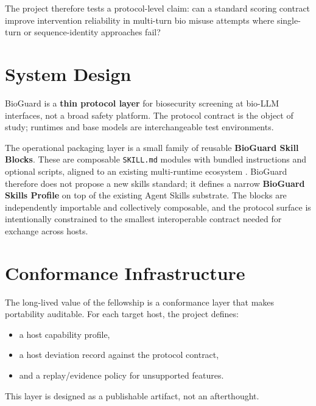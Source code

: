 \documentclass[10.5pt,a4paper]{article}
\begin{document}
The project therefore tests a protocol-level claim: can a standard scoring contract improve intervention reliability in multi-turn bio misuse attempts where single-turn or sequence-identity approaches fail?

\section*{System Design}

BioGuard is a \textbf{thin protocol layer} for biosecurity screening at bio-LLM interfaces, not a broad safety platform. The protocol contract is the object of study; runtimes and base models are interchangeable test environments.

The operational packaging layer is a small family of reusable \textbf{BioGuard Skill Blocks}. These are composable \texttt{SKILL.md} modules with bundled instructions and optional scripts, aligned to an existing multi-runtime ecosystem \cite{agentskills2026,claude2026,githubclispec,openai2026}. BioGuard therefore does not propose a new skills standard; it defines a narrow \textbf{BioGuard Skills Profile} on top of the existing Agent Skills substrate. The blocks are independently importable and collectively composable, and the protocol surface is intentionally constrained to the smallest interoperable contract needed for exchange across hosts.

\section*{Conformance Infrastructure}

The long-lived value of the fellowship is a conformance layer that makes portability auditable. For each target host, the project defines:
\begin{itemize}[leftmargin=1.2em]
  \item a host capability profile,
  \item a host deviation record against the protocol contract,
  \item and a replay/evidence policy for unsupported features.
\end{itemize}

This layer is designed as a publishable artifact, not an afterthought.
\end{document}
